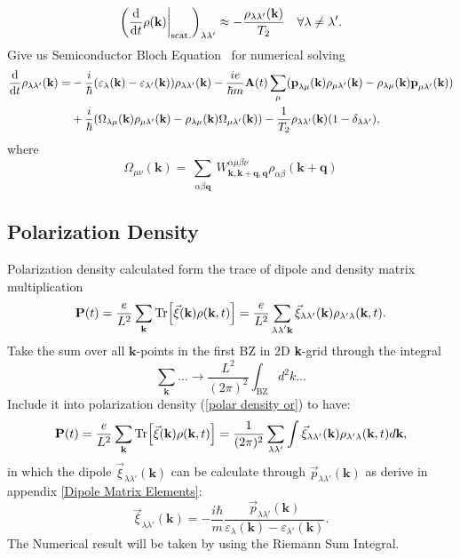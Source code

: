 \documentclass[12pt,english,a4paper]{article}
\begin{document}
\begin{equation}
	\bigg(\dv{ }{t} \rho(\textbf{k})\bigg|_{\mathrm{scat.}}\bigg)_{\lambda \lambda'} \approx -\frac{\rho_{\lambda \lambda'}(\textbf{k})}{T_2}\quad \forall \lambda \neq \lambda'. 
\end{equation}
Give us Semiconductor Bloch Equation~\cite{haug_quantum_2009} for numerical solving
\begin{align}
	\label{SBE}
	\dv{ }{t}\rho_{\lambda\lambda'}(\textbf{k}) = &- \frac{i}{\hbar} (\varepsilon_\lambda(\textbf{k}) - \varepsilon_{\lambda'} (\textbf{k}))\rho_{\lambda \lambda'}(\textbf{k}) - \frac{ie}{\hbar m} \textbf{A}(t)\sum_{\mu}(\textbf{p}_{\lambda\mu}(\textbf{k})\rho_{\mu \lambda'}(\textbf{k}) - \rho_{\lambda\mu}(\textbf{k})\textbf{p}_{\mu \lambda'}(\textbf{k})) \nonumber \\
	&+ \frac{i}{\hbar}(\Omega_{\lambda \mu}(\textbf{k})\rho_{\mu \lambda'}(\textbf{k}) - \rho_{\lambda\mu}(\textbf{k}) \Omega_{\mu \lambda'} (\textbf{k})) -\frac{1}{T_2}\rho_{\lambda\lambda'}(\textbf{k})(1-\delta_{\lambda\lambda'}),
\end{align}
\quad where
\begin{equation}
	\Omega_{\mu\nu} (\textbf{k})=\sum_{\substack{\alpha\beta \textbf{q}}} W^{\alpha \mu \beta \nu}_{\textbf{k},\textbf{k}+\textbf{q},\textbf{q}} \rho_{\alpha\beta} (\textbf{k}+\textbf{q})
\end{equation}
\subsection{Polarization Density}
\quad Polarization density calculated form the trace of dipole and density matrix multiplication
\begin{equation}
\label{polar density or}
\textbf{P}(t) = \frac{e}{L^2} \sum_{\textbf{k}}\Tr[\vec{\xi}(\textbf{k})\rho(\textbf{k},t)] = \frac{e}{L^2}\sum_{\substack{\lambda \lambda'\textbf{k}}} \vec{\xi}_{\lambda \lambda' }(\textbf{k})\rho_{\lambda' \lambda}(\textbf{k},t).
\end{equation}
\quad Take the sum over all $\textbf{k}$-points in the first BZ in 2D \textbf{k}-grid through the integral
\begin{equation}
\sum_{\textbf{k}}... \to \frac{L^2}{(2\pi)^2}\int_{\mathrm{BZ}} d^2 k...
\end{equation}
\quad Include it into polarization density (\ref{polar density or}) to have:
\begin{equation}
	\label{polar}
\textbf{P}(t) = \frac{e}{L^2} \sum_{\textbf{k}} \Tr[\vec{\xi} (\textbf{k}) \rho(\textbf{k},t)] = \frac{1}{(2\pi)^2} \sum_{\lambda\lambda'}	\int \vec{\xi}_{\lambda \lambda'} (\textbf{k}) \rho_{\lambda'\lambda}(\textbf{k},t)d\textbf{k},
\end{equation}
in which the dipole $\vec{\xi}_{\lambda \lambda'}(\textbf{k})$ can be calculate through $\vec{p}_{\lambda \lambda'}(\textbf{k})$ as derive in appendix \ref{Dipole Matrix Elements}:
\begin{equation}
	\vec{\xi}_{\lambda \lambda'} (\textbf{k}) = -\frac{i\hbar }{m} \frac{\vec{p}_{\lambda \lambda'}(\textbf{k})}{\varepsilon_{\lambda}(\textbf{k}) - \varepsilon_{\lambda'}(\textbf{k})}.
\end{equation}
\quad The Numerical result will be taken by using the Riemann Sum Integral.
\newpage
\end{document}
